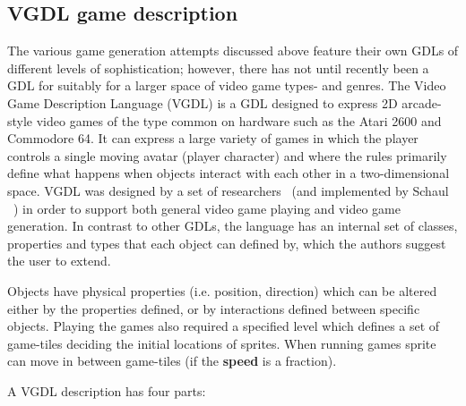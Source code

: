 \documentclass[a4paper,titlepage,final]{report}
\begin{document}
\subsection{VGDL game description}
\label{ssec_vgdl}
The various game generation attempts discussed above feature their own GDLs of different levels of sophistication; however, there has not until recently been a GDL for suitably for a larger space of video game types- and genres.
The Video Game Description Language (VGDL) is a GDL designed to express 2D arcade-style video games of the type common on hardware such as the Atari 2600 and Commodore 64. It can express a large variety of games in which the player controls a single moving avatar (player character) and where the rules primarily define what happens when objects interact with each other in a two-dimensional space. VGDL was designed by a set of researchers~\citet{levine2013general,ebner2013towards} (and implemented by Schaul ~\citet{schaul2013video}) in order to support both general video game playing and video game generation.
In contrast to other GDLs, the language has an internal set of classes, properties and types that each object can defined by, which the authors suggest the user to extend.

Objects have physical properties (i.e. position, direction) which can be altered either by the properties defined, or by interactions defined between specific objects. 
Playing the games also required a specified level which defines a set of game-tiles deciding the initial locations of sprites. When running games sprite can move in between game-tiles (if the \textbf{speed} is a fraction).

A VGDL description has four parts: 
\end{document}
